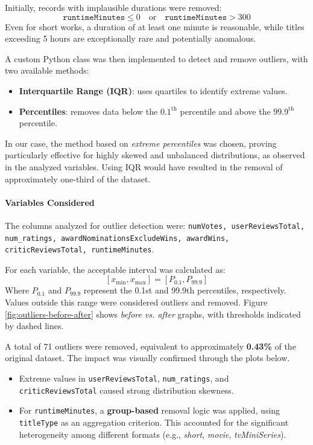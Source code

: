 \documentclass[10pt]{article}
\begin{document}
Initially, records with implausible durations were removed:
\[
\texttt{runtimeMinutes} \leq 0 \quad \text{or} \quad \texttt{runtimeMinutes} > 300
\]
Even for short works, a duration of at least one minute is reasonable, while titles exceeding 5 hours are exceptionally rare and potentially anomalous.

A custom Python class was then implemented to detect and remove outliers, with two available methods:

\begin{itemize}
    \item \textbf{Interquartile Range (IQR)}: uses quartiles to identify extreme values.
    \item \textbf{Percentiles}: removes data below the $0.1^{\text{th}}$ percentile and above the $99.9^{\text{th}}$ percentile.
\end{itemize}

In our case, the method based on \textit{extreme percentiles} was chosen, proving particularly effective for highly skewed and unbalanced distributions, as observed in the analyzed variables. Using IQR would have resulted in the removal of approximately one-third of the dataset.

\paragraph{Variables Considered}
The columns analyzed for outlier detection were: \texttt{numVotes, userReviewsTotal, num\_ratings, awardNominationsExcludeWins, awardWins, criticReviewsTotal, runtimeMinutes}.

For each variable, the acceptable interval was calculated as:
\[
[x_{\text{min}}, x_{\text{max}}] = [P_{0.1}, P_{99.9}]
\]
Where $P_{0.1}$ and $P_{99.9}$ represent the 0.1st and 99.9th percentiles, respectively. Values outside this range were considered outliers and removed. Figure \ref{fig:outliers-before-after} shows \textit{before vs. after} graphs, with thresholds indicated by dashed lines.

A total of 71 outliers were removed, equivalent to approximately \textbf{0.43\%} of the original dataset. The impact was visually confirmed through the plots below.

\begin{itemize}
    \item Extreme values in \texttt{userReviewsTotal}, \texttt{num\_ratings}, and \texttt{criticReviewsTotal} caused strong distribution skewness.
    \item For \texttt{runtimeMinutes}, a \textbf{group-based} removal logic was applied, using \texttt{titleType} as an aggregation criterion. This accounted for the significant heterogeneity among different formats (e.g., \textit{short}, \textit{movie}, \textit{tvMiniSeries}).
\end{itemize}
\end{document}
